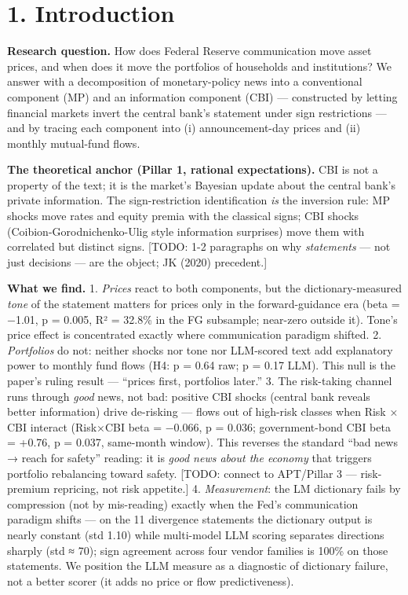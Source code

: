 \section{1. Introduction}\label{introduction}

\textbf{Research question.} How does Federal Reserve communication move asset prices, and when does it move the portfolios of households and institutions? We answer with a decomposition of monetary-policy news into a conventional component (MP) and an information component (CBI) --- constructed by letting financial markets invert the central bank's statement under sign restrictions --- and by tracing each component into (i) announcement-day prices and (ii) monthly mutual-fund flows.

\textbf{The theoretical anchor (Pillar 1, rational expectations).} CBI is not a property of the text; it is the market's Bayesian update about the central bank's private information. The sign-restriction identification \emph{is} the inversion rule: MP shocks move rates and equity premia with the classical signs; CBI shocks (Coibion-Gorodnichenko-Ulig style information surprises) move them with correlated but distinct signs. {[}TODO: 1-2 paragraphs on why \emph{statements} --- not just decisions --- are the object; JK (2020) precedent.{]}

\textbf{What we find.} 1. \emph{Prices} react to both components, but the dictionary-measured \emph{tone} of the statement matters for prices only in the forward-guidance era (beta = −1.01, p = 0.005, R² = 32.8\% in the FG subsample; near-zero outside it). Tone's price effect is concentrated exactly where communication paradigm shifted. 2. \emph{Portfolios} do not: neither shocks nor tone nor LLM-scored text add explanatory power to monthly fund flows (H4: p = 0.64 raw; p = 0.17 LLM). This null is the paper's ruling result --- ``prices first, portfolios later.'' 3. The risk-taking channel runs through \emph{good} news, not bad: positive CBI shocks (central bank reveals better information) drive de-risking --- flows out of high-risk classes when Risk × CBI interact (Risk×CBI beta = −0.066, p = 0.036; government-bond CBI beta = +0.76, p = 0.037, same-month window). This reverses the standard ``bad news → reach for safety'' reading: it is \emph{good news about the economy} that triggers portfolio rebalancing toward safety. {[}TODO: connect to APT/Pillar 3 --- risk-premium repricing, not risk appetite.{]} 4. \emph{Measurement}: the LM dictionary fails by compression (not by mis-reading) exactly when the Fed's communication paradigm shifts --- on the 11 divergence statements the dictionary output is nearly constant (std 1.10) while multi-model LLM scoring separates directions sharply (std ≈ 70); sign agreement across four vendor families is 100\% on those statements. We position the LLM measure as a diagnostic of dictionary failure, not a better scorer (it adds no price or flow predictiveness).

